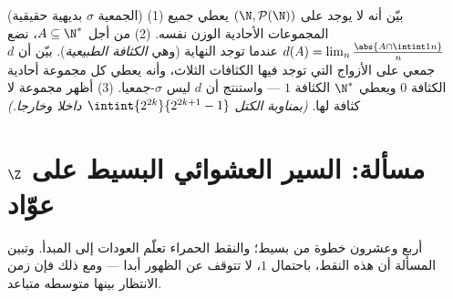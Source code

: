 \begin{exercise}[$\star\star\star$]\label{exo:b2:proba:12}
(الجمعية $\sigma$ بديهية حقيقية)
(1) بيّن أنه لا يوجد  على $(\N,
\mathcal P(\N))$ يعطي جميع المجموعات
الأحادية الوزن نفسه.
(2) من أجل $A \subseteq \N^*$، نضع $d(A) =
\lim_n\frac{\abs{A\cap\intint1n}}{n}$ عندما توجد النهاية (وهي \emph{الكثافة
الطبيعية}). بيّن أن $d$ جمعي على الأزواج التي توجد فيها الكثافات
الثلاث، وأنه يعطي كل مجموعة أحادية الكثافة $0$ ويعطي $\N^*$
الكثافة $1$ --- واستنتج أن $d$ ليس $\sigma$-جمعيا.
(3) أظهر مجموعة لا كثافة لها. \emph{(بمناوبة الكتل $\intint{2^{2k}}{2^{2k+1}-1}$ داخلا
وخارجا.)}
\end{exercise}

\section{مسألة: السير العشوائي البسيط على $\Z$ عوّاد}

\begin{omfigure}

{\small أربع وعشرون خطوة من  بسيط؛ والنقط الحمراء تعلّم
العودات إلى المبدأ. وتبين المسألة أن هذه النقط، باحتمال $1$، لا
تتوقف عن الظهور أبدا --- ومع ذلك فإن زمن الانتظار بينها متوسطه
متباعد.}
\end{omfigure}

